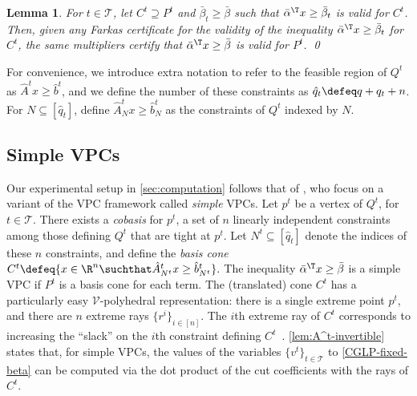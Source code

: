 \documentclass[oribibl,envcountsame]{llncs}
\newtheorem{lemma}[theorem]{Lemma}
\theoremstyle{remark}
\theoremstyle{definition}
\newcommand{\disjTermsIndexSet}{\mathcal{T}}
\newcommand{\numRowsP}{q}
\newcommand{\numRowsDt}{q_t}
\newcommand{\numRowsQt}{\hat{q}_t}
\newcommand{\submx}[2]{#1_{#2}}
\begin{document}
\begin{lemma}
\label{lem:weaker-certificate}
    For $t \in \disjTermsIndexSet$, let $C^t \supseteq P^t$ and $\bar{\beta}_t \ge \bar{\beta}$ such that $\bar{\alpha}^\T x \ge \bar{\beta}_t$ is valid for $C^t$.
    Then, given any Farkas certificate for the validity of the inequality $\bar{\alpha}^\T x \ge \bar{\beta}_t$ for $C^t$,
    the same multipliers certify that $\bar{\alpha}^\T x \ge \bar{\beta}$ is valid for $P^t$. \qed
\end{lemma}

For convenience, we introduce extra notation to refer to the feasible region of $Q^t$ as $\hat{A}^t x \ge \hat{b}^t$,
and we define the number of these constraints as $\numRowsQt \defeq \numRowsP + \numRowsDt + n$.
For $N \subseteq [\numRowsQt]$, define $\submx{\hat{A}^t}{N} x \ge \submx{\hat{b}^t}{N}$ as the constraints of $Q^t$ indexed by $N$.

\subsection{Simple VPCs}
\label{sec:simple-vpcs}

Our experimental setup in \cref{sec:computation} follows that of \citet{BalKaz22+_vpc-arxiv}, who focus on a variant of the VPC framework called \emph{simple} VPCs.
Let $p^t$ be a vertex of $Q^t$, for $t \in \disjTermsIndexSet$.
There exists a \emph{cobasis} for $p^t$, a set of $n$ linearly independent constraints among those defining $Q^t$ that are tight at $p^t$.
Let $N^t \subseteq [\numRowsQt]$ denote the indices of these $n$ constraints,
and define the \emph{basis cone} 
    $
        C^t \defeq 
            \{
                x \in \R^n \suchthat
                \submx{\hat{A}^t}{N^t} x \ge \submx{\hat{b}^t}{N^t}
            \}.
    $
The inequality $\bar{\alpha}^\T x \ge \bar{\beta}$ is a simple VPC if $P^t$ is a basis cone for each term.
The (translated) cone $C^t$ has a particularly easy $\mathcal{V}$-polyhedral representation:
there is a single extreme point $p^t$, and there are $n$ extreme rays $\{r^i\}_{i \in [n]}$.
The $i$th extreme ray of $C^t$ corresponds to increasing the ``slack'' on the $i$th constraint defining $C^t$~\cite[Chapter~6]{ConCorZam14}.
\cref{lem:A^t-invertible} states that, 
for simple VPCs,
the values of the variables $\{v^t\}_{t \in \disjTermsIndexSet}$ to \eqref{CGLP-fixed-beta} can be computed via the dot product of the cut coefficients with the rays of $C^t$.
\end{document}
